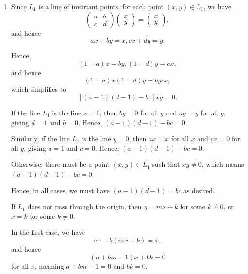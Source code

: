 \Question{\currfilebase}

\begin{enumerate}
    \item Since \(L_1\) is a line of invariant points, for each point \((x, y) \in L_1\), we have
          \[
              \begin{pmatrix}
                  a & b \\
                  c & d
              \end{pmatrix}
              \begin{pmatrix}
                  x \\
                  y
              \end{pmatrix}
              = \begin{pmatrix}
                  x \\
                  y
              \end{pmatrix},
          \]
          and hence
          \[
              ax + by = x, cx + dy = y.
          \]

          Hence,
          \[
              (1 - a) x = by, (1 - d)y = cx,
          \]
          and hence
          \[
              (1 - a) x (1 - d)y = bycx,
          \]
          which simplifies to
          \[
              [(a - 1)(d - 1) - bc] xy = 0.
          \]

          If the line \(L_1\) is the line \(x = 0\), then \(by = 0\) for all \(y\) and \(dy = y\) for all \(y\), giving \(d = 1\) and \(b = 0\). Hence, \((a - 1) (d - 1) - bc = 0\).

          Similarly, if the line \(L_1\) is the line \(y = 0\), then \(ax = x\) for all \(x\) and \(cx = 0\) for all \(y\), giving \(a = 1\) and \(c = 0\). Hence, \((a - 1) (d - 1) - bc = 0\).

          Otherwise, there must be a point \((x, y) \in L_1\) such that \(xy \neq 0\), which means \((a - 1) (d - 1) - bc = 0\).

          Hence, in all cases, we must have \((a - 1) (d - 1) = bc\) as desired.

          If \(L_1\) does not pass through the origin, then \(y = mx + k\) for some \(k \neq 0\), or \(x = k\) for some \(k \neq 0\).

          In the first case, we have
          \[
              ax + b(mx + k) = x,
          \]
          and hence
          \[
              (a + bm - 1)x + bk = 0
          \]
          for all \(x\), meaning \(a + bm - 1 = 0\) and \(bk = 0\).


\end{enumerate}

